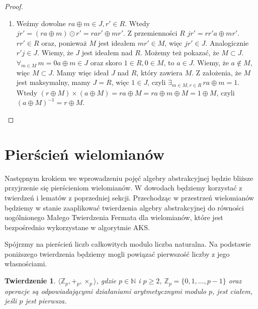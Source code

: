 \documentclass[declaration,shortabstract]{iithesis}
\theoremstyle{definition}
\theoremstyle{remark} \newtheorem{observation}{Obserwacja}
\theoremstyle{plain} \newtheorem{theorem}{Twierdzenie}
\theoremstyle{plain} \newtheorem{lemma}{Lemat}
\theoremstyle{remark} \newtheorem*{remark*}{Uwaga}
\theoremstyle{reminder} \newtheorem*{reminder*}{Przypomnienie}
\begin{document}
\begin{proof}
\begin{enumerate}[label=(\arabic*),leftmargin=.4in]
\begin{enumerate}[label=(2.\arabic*)]
            \item Weźmy dowolne $ra \oplus m \in J, r' \in R$. Wtedy $jr' = (ra \oplus m) \odot r' = rar' \oplus mr'$. Z przemienności $R$ $jr' = rr'a \oplus mr'$. $rr' \in R$ oraz, ponieważ $M$ jest ideałem $mr' \in M$, więc $jr' \in J$. Analogicznie $r'j \in J$.
            \newline
            Wiemy, że $J$ jest ideałem nad $R$. Możemy też pokazać, że $M \subset J$. $\forall_{m \in M} \, m = 0a \oplus m \in J$ oraz skoro $1 \in R, 0 \in M$, to $a \in J$. Wiemy, że $a \notin M$, więc $M \subset J$.
            \newline
            Mamy więc ideał $J$ nad $R$, który zawiera $M$. Z założenia, że $M$ jest maksymalny, mamy $J = R$, więc $1 \in J$, czyli $\exists_{m \in M, r \in R} \, ra \oplus m = 1$. Wtedy $(r \oplus M) \times (a \oplus M) = ra \oplus M = ra \oplus m \oplus M = 1 \oplus M$, czyli $(a \oplus M)^{-1} = r \oplus M$.
        \end{enumerate}
    \end{enumerate}
\end{proof}

\section{Pierścień wielomianów}

Następnym krokiem we wprowadzeniu pojęć algebry abstrakcyjnej będzie bliższe przyjrzenie się pierścieniom wielomianów. W dowodach będziemy korzystać z twierdzeń i lematów z poprzedniej sekcji. Przechodząc w przestrzeń wielomianów będziemy w stanie zaaplikować twierdzenia algebry abstrakcyjnej do równości uogólnionego Małego Twierdzenia Fermata dla wielomianów, które jest bezpośrednio wykorzystane w algorytmie AKS.

Spójrzmy na pierścień liczb całkowitych modulo liczba naturalna. Na podstawie poniższego twierdzenia będziemy mogli powiązać pierwszość liczby z jego własnościami.

\begin{theorem}
	$\langle \mathbb{Z}_p, +_p, \times_p \rangle$, gdzie $p \in \mathbb{N}$ i $p \geq 2$,  $\mathbb{Z}_p = \{0, 1, \ldots, p-1\}$ oraz operacje są odpowiadającymi działaniami arytmetycznymi modulo $p$, jest ciałem, jeśli $p$ jest pierwsza.
\end{theorem}
\end{document}
